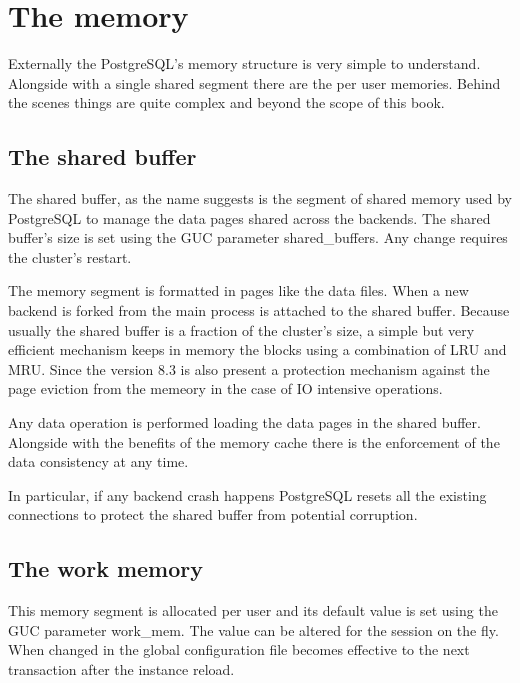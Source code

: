 \section{The memory}
\label{sec:MEMORY}
Externally the PostgreSQL's memory structure is very simple to understand. Alongside with a single
shared segment there are the per user memories. Behind the scenes things are quite complex and
beyond the scope of this book.

\subsection{The shared buffer}
The shared buffer, as the name suggests is the segment of shared memory used by PostgreSQL to manage
the data pages shared across the backends. The shared buffer's size is set using the GUC parameter
shared\_buffers. Any change requires the cluster's restart.\newline

The memory segment is formatted in pages like the data files. When a new backend is forked
from the main process is attached to the shared buffer. Because usually the shared buffer is
a fraction of the cluster's size, a simple but very efficient mechanism keeps in memory the blocks
using a combination of LRU and MRU. Since the version 8.3 is also present a protection mechanism
against the page eviction from the memeory in the case of IO intensive  operations.\newline

Any data operation is performed loading the data pages in the shared buffer. Alongside with the
benefits of the memory cache there is the enforcement of the data consistency at any time.\newline

In particular, if any backend crash happens PostgreSQL resets all the existing connections to
protect the shared buffer from potential corruption. 



\subsection{The work memory}
\label{sub:WORKMEM}
This memory segment is allocated per user and its default value is set using 
the GUC parameter work\_mem. The value can be altered for the session on the 
fly. When changed in the global configuration file becomes effective to the 
next transaction after the instance reload. 

